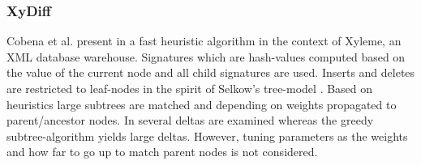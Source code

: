 \subsubsection{XyDiff\cite{cobena2002detecting}}
Cobena et al. present in \cite{cobena2002detecting} a fast heuristic algorithm in the context of Xyleme, an XML database warehouse. %
Signatures which are hash-values computed based on the value of the current node and all child signatures are used. Inserts and deletes are restricted to leaf-nodes in the spirit of Selkow's tree-model \cite{tai1979tree}. Based on heuristics large subtrees are matched and depending on weights propagated to parent/ancestor nodes. In \cite{ronnau2009efficient} several deltas are examined whereas the greedy subtree-algorithm yields large deltas. However, tuning parameters as the weights and how far to go up to match parent nodes is not considered.


